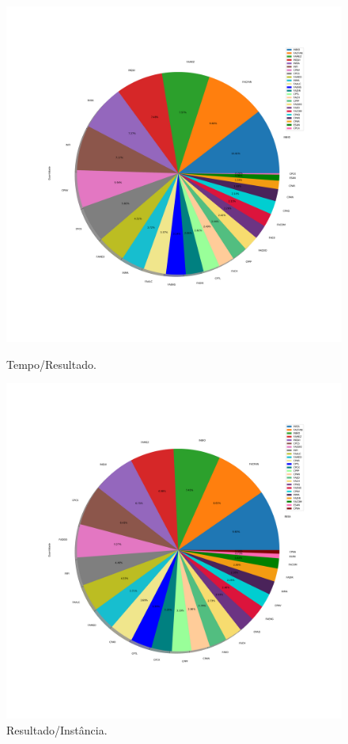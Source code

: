 \documentclass[a4paper, 12pt]{article}
\begin{document}
\begin{figure}[!htb]
    \centering
    \begin{minipage}{0.5\textwidth}
        \centering
        \includegraphics[width=1\textwidth]{../Resultados/img/porcentagem_2018.pdf}
        \caption{Tempo/Resultado.}
        \label{fig:scatter_topDown}
    \end{minipage}%
    \begin{minipage}{0.5\textwidth}
        \centering
        \includegraphics[width=1\textwidth]{../Resultados/img/porcentagem_2019.pdf}
        \caption{Resultado/Instância.}
        \label{fig:result_topDown}
    \end{minipage}
\end{figure}
\end{document}

